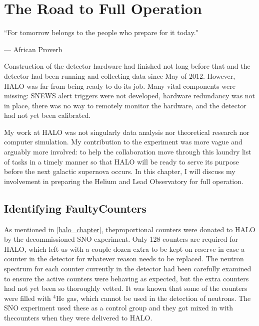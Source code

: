 %
%
%
%


\chapter{The Road to Full Operation}
	\label{halo2_chapter}

	\begin{quoting}
		\noindent \large ``For tomorrow belongs to the people who prepare for it today." \normalsize

		--- African Proverb
	\end{quoting}

	 Construction of the detector hardware had finished not long before that and the detector had been running and collecting data since May of 2012. However, HALO was far from being ready to do its job. Many vital components were missing: SNEWS alert triggers were not developed, hardware redundancy was not in place, there was no way to remotely monitor the hardware, and the detector had not yet been calibrated. 

	My work at HALO was not singularly data analysis nor theoretical research nor computer simulation. My contribution to the experiment was more vague and arguably more involved: to help the collaboration move through this laundry list of tasks in a timely manner so that HALO will be ready to serve its purpose before the next galactic supernova occurs. In this chapter, I will discuss my involvement in preparing the Helium and Lead Observatory for full operation.

	
	\section{Identifying Faulty{}\he Counters}
		As mentioned in \CHP \ref{halo_chapter}, the{}\he proportional counters were donated to HALO by the decommissioned SNO experiment. Only 128 counters are required for HALO, which left us with a couple dozen extra to be kept on reserve in case a counter in the detector for whatever reason needs to be replaced. The neutron spectrum for each counter currently in the detector had been carefully examined to ensure the active counters were behaving as expected, but the extra counters had not yet been so thoroughly vetted. It was known that some of the counters were filled with $^4$He gas, which cannot be used in the detection of neutrons. The SNO experiment used these as a control group and they got mixed in with the{}\he counters when they were delivered to HALO. 

